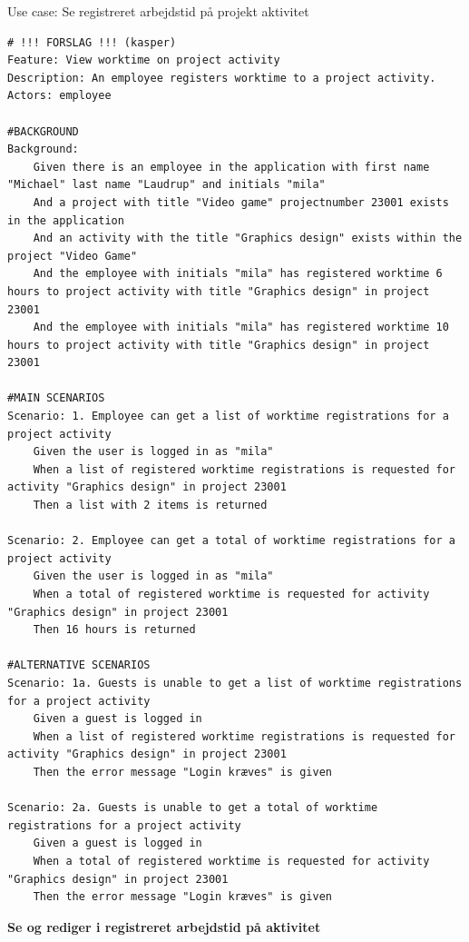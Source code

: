 \begin{listing}[H]
    \centering
    \caption{Use case: Se registreret arbejdstid på projekt aktivitet} \label{lst:usecase_view_worktime_projectactivity}
    \begin{verbatim}  
# !!! FORSLAG !!! (kasper)
Feature: View worktime on project activity
Description: An employee registers worktime to a project activity.
Actors: employee

#BACKGROUND
Background:
    Given there is an employee in the application with first name "Michael" last name "Laudrup" and initials "mila"
    And a project with title "Video game" projectnumber 23001 exists in the application
    And an activity with the title "Graphics design" exists within the project "Video Game"
    And the employee with initials "mila" has registered worktime 6 hours to project activity with title "Graphics design" in project 23001
    And the employee with initials "mila" has registered worktime 10 hours to project activity with title "Graphics design" in project 23001

#MAIN SCENARIOS
Scenario: 1. Employee can get a list of worktime registrations for a project activity
    Given the user is logged in as "mila"
    When a list of registered worktime registrations is requested for activity "Graphics design" in project 23001
    Then a list with 2 items is returned

Scenario: 2. Employee can get a total of worktime registrations for a project activity
    Given the user is logged in as "mila"
    When a total of registered worktime is requested for activity "Graphics design" in project 23001
    Then 16 hours is returned

#ALTERNATIVE SCENARIOS
Scenario: 1a. Guests is unable to get a list of worktime registrations for a project activity
    Given a guest is logged in
    When a list of registered worktime registrations is requested for activity "Graphics design" in project 23001
    Then the error message "Login kræves" is given

Scenario: 2a. Guests is unable to get a total of worktime registrations for a project activity
    Given a guest is logged in
    When a total of registered worktime is requested for activity "Graphics design" in project 23001
    Then the error message "Login kræves" is given
    \end{verbatim}
\end{listing}\newpage
\textbf{Se og rediger i registreret arbejdstid på aktivitet}
